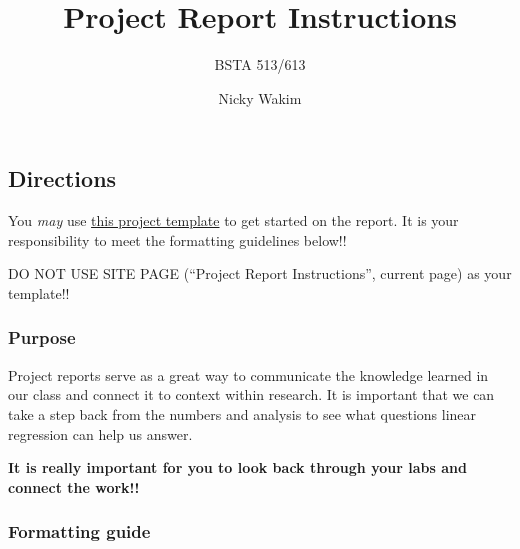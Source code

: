 \documentclass[
  letterpaper,
  DIV=11,
  numbers=noendperiod]{scrartcl}
\title{Project Report Instructions}
\subtitle{BSTA 513/613}
\author{Nicky Wakim}
\date{}
\begin{document}
\maketitle


\subsection{Directions}\label{directions}

\begin{tcolorbox}[enhanced jigsaw, colback=white, bottomrule=.15mm, colframe=quarto-callout-important-color-frame, toptitle=1mm, leftrule=.75mm, arc=.35mm, colbacktitle=quarto-callout-important-color!10!white, coltitle=black, left=2mm, bottomtitle=1mm, titlerule=0mm, breakable, opacitybacktitle=0.6, rightrule=.15mm, toprule=.15mm, title=\textcolor{quarto-callout-important-color}{\faExclamation}\hspace{0.5em}{Project template}, opacityback=0]

You \emph{may} use
\href{https://github.com/nwakim/S2024_BSTA_513/blob/main/project/Project_template.qmd}{this
project template} to get started on the report. It is your
responsibility to meet the formatting guidelines below!!

DO NOT USE SITE PAGE (``Project Report Instructions'', current page) as
your template!!

\end{tcolorbox}

\subsubsection{Purpose}\label{purpose}

Project reports serve as a great way to communicate the knowledge
learned in our class and connect it to context within research. It is
important that we can take a step back from the numbers and analysis to
see what questions linear regression can help us answer.

\textbf{It is really important for you to look back through your labs
and connect the work!!}

\subsubsection{Formatting guide}\label{formatting-guide}
\end{document}
